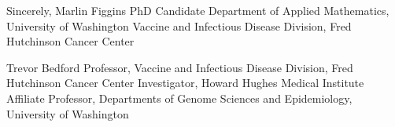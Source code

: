 \documentclass[11pt]{article}
\begin{document}
\vspace{0.3in} %

Sincerely, \newline
\vspace{0.05in} \newline
Marlin Figgins \newline
PhD Candidate \newline
Department of Applied Mathematics, University of Washington \newline
Vaccine and Infectious Disease Division, Fred Hutchinson Cancer Center

\vspace{0.2in}

Trevor Bedford \newline
Professor, Vaccine and Infectious Disease Division, Fred Hutchinson Cancer Center \newline
Investigator, Howard Hughes Medical Institute \newline
Affiliate Professor, Departments of Genome Sciences and Epidemiology, University of Washington
\end{document}
